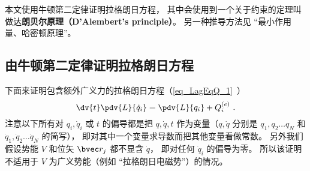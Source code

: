 

本文使用牛顿第二定律证明拉格朗日方程， 其中会使用到一个关于约束的定理叫做达\textbf{朗贝尔原理（D'Alembert's principle）}。 另一种推导方法见 “最小作用量、哈密顿原理”。

\subsection{由牛顿第二定律证明拉格朗日方程}
下面来证明包含额外广义力的拉格朗日方程（\autoref{eq_LagEqQ_1}~）
\begin{equation}
\dv{t} \pdv{L}{\dot q_i} = \pdv{L}{q_i} + Q_i^{(e)}~.
\end{equation}
注意以下所有对 $q_i, \dot q_i$ 或 $t$ 的偏导都是把 $q, \dot q, t$ 作为变量（$q, \dot q$ 分别是 $q_1, q_2\dots q_N$ 和 $\dot q_1, \dot q_2\dots \dot q_N$ 的简写）， 即对其中一个变量求导数而把其他变量看做常数。 另外我们假设势能 $V$ 和位矢 $\bvec r_j$ 都不显含 $\dot q$， 即对任何 $\dot q_i$ 的偏导为零。 所以该证明不适用于 $V$ 为广义势能（例如 “拉格朗日电磁势”）的情况。

